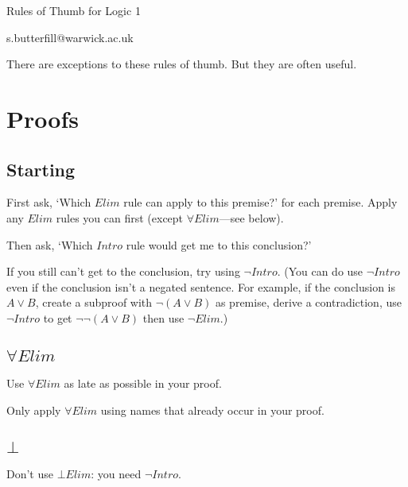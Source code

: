 \documentclass[11pt]{extarticle}
\date{}
\begin{document}
\begin{multicols}{3}

\setlength\footnotesep{1em}









\begin{center}
{\Large
Rules of Thumb for Logic 1}


s.butterfill@warwick.ac.uk
\end{center}


There are exceptions to these rules of thumb.
But they are often useful.

\section{Proofs}

\subsection{Starting}
First ask, ‘Which $Elim$ rule can apply to this premise?’ for each premise.
Apply any $Elim$ rules you can first (except $\forall Elim$---see below).

Then ask, ‘Which $Intro$ rule would get me to this conclusion?’

If you still can’t get to the conclusion, try using $\lnot Intro$.
(You can do use $\lnot Intro$ even if the conclusion isn’t a negated sentence.
For example, if the conclusion is $A \lor B$, create a subproof with $\lnot(A \lor B)$ as premise, derive a contradiction, use $\lnot Intro$ to get $\lnot \lnot(A \lor B)$ then use $\lnot Elim$.)


\subsection{$\forall Elim$}
Use $\forall Elim$ as late as possible in your proof.

Only apply $\forall Elim$ using names that already occur in your proof.

\subsection{$\bot$}
Don’t use $\bot Elim$: you need $\lnot Intro$.


\end{multicols}
\end{document}

